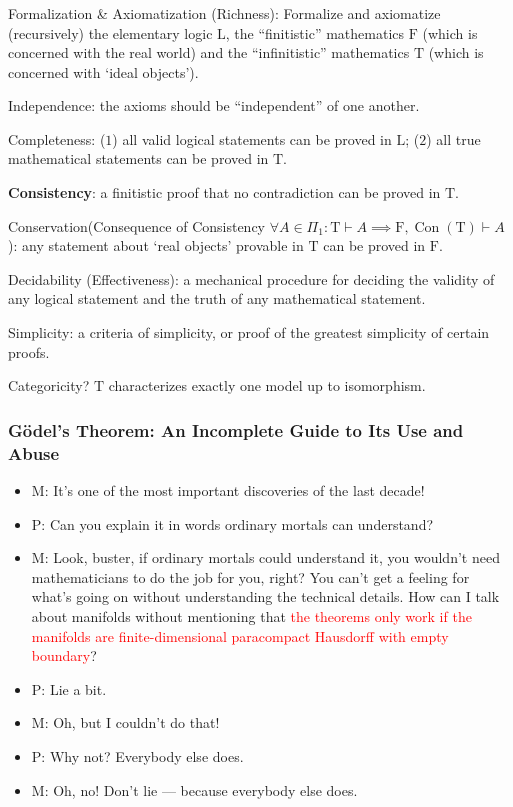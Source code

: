 \documentclass[UTF8,11pt,colorlinks,compress,openany]{beamer}%
\begin{document}
\begin{frame}\frametitle{\hyperlink{incompatibility}{}}
\label{hilbert-program}
		\begin{enumerate}{\small 
			\item Formalization \& Axiomatization (Richness): Formalize and axiomatize (recursively) the elementary logic $\mathrm{L}$, the ``finitistic'' mathematics $\mathrm{F}$ (which is concerned with the real world) and the ``infinitistic'' mathematics $\mathrm{T}$ (which is concerned with `ideal objects').
			\item Independence: the axioms should be ``independent'' of one another.
			\item Completeness: ($1$) all valid logical statements can be proved in $\mathrm{L}$; ($2$) all true mathematical statements can be proved in $\mathrm{T}$.
			\item \textbf{Consistency}: a finitistic proof that no contradiction can be proved in $\mathrm{T}$.
			\item Conservation({\footnotesize Consequence of Consistency $\forall A\in\Pi_1: \mathrm{T}\vdash A\implies \mathrm{F},\operatorname{Con}(\mathrm{T})\vdash A$}): any statement about `real objects' provable in $\mathrm{T}$ can be proved in $\mathrm{F}$.
			\item Decidability (Effectiveness): a mechanical procedure for deciding the validity of any logical statement and the truth of any mathematical statement.}
			\item Simplicity: a criteria of simplicity, or proof of the greatest simplicity of certain proofs.
			\item Categoricity? $\mathrm{T}$ characterizes exactly one model up to isomorphism.
		\end{enumerate}
\end{frame}

\begin{frame}\frametitle{\small G\"odel's Theorem: An Incomplete Guide to Its Use and Abuse}
\begin{itemize}
	\item M: It's one of the most important discoveries of the last decade!
	\item P: Can you explain it in words ordinary mortals can understand?
	\item M: Look, buster, if ordinary mortals could understand it, you wouldn't need mathematicians to do the job for you, right? You can't get a feeling for what's going on without understanding the technical details. How can I talk about manifolds without mentioning that \textcolor{red}{the theorems only work if the manifolds are finite-dimensional paracompact Hausdorff with empty boundary}?
	\item P: Lie a bit.
	\item M: Oh, but I couldn't do that!
	\item P: Why not? Everybody else does.
	\item M: Oh, no! Don't lie --- because everybody else does.
\end{itemize}
\end{frame}
\end{document}
